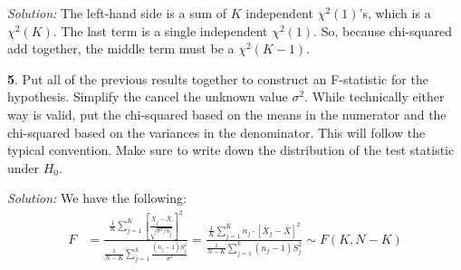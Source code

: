 \documentclass{tufte-handout}
\begin{document}
\textit{Solution:} The left-hand side is a sum of $K$ independent $\chi^2(1)$'s, which is a
$\chi^2(K)$. The last term is a single independent $\chi^2(1)$. So, because
chi-squared add together, the middle term must be a $\chi^2(K - 1)$.

\textbf{5}. Put all of the previous results together to construct an F-statistic for the
hypothesis. Simplify the cancel the unknown value $\sigma^2$. While technically
either way is valid, put the chi-squared based on the means in the numerator and
the chi-squared based on the variances in the denominator. This will follow the
typical convention. Make sure to write down the distribution of the test statistic
under $H_0$.

\textit{Solution:} We have the following:
\begin{align*}
F &= \frac{
  \frac{1}{K} \sum_{j=1}^K \left[\frac{\bar{X}_j - \bar{X}}{\sqrt{\sigma^2 / n_j}}\right]^2
}{
  \frac{1}{N-K} \sum_{j=1}^k \frac{(n_j - 1) S_j^2}{\sigma^2}
} = \frac{
  \frac{1}{K} \sum_{j=1}^K n_j \cdot \left[\bar{X}_j - \bar{X}\right]^2
}{
  \frac{1}{N-K} \sum_{j=1}^k (n_j - 1) S_j^2
} \sim F(K, N-K)
\end{align*}
\end{document}
